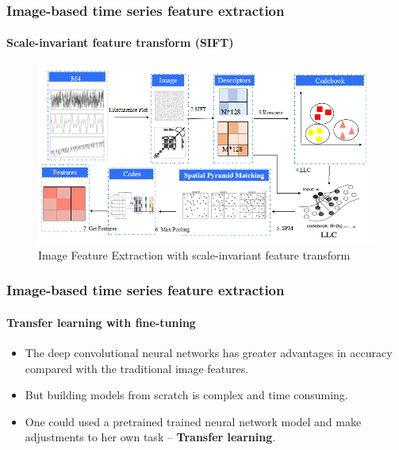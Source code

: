\documentclass[10pt,aspectratio=43]{beamer}
\begin{document}
\begin{frame}
  \frametitle{Image-based time series feature extraction}
  \framesubtitle{Scale-invariant feature transform (SIFT)}

\begin{figure}
  \centering \includegraphics[width=1\linewidth]{figures/feature_extraction_sift.png}
  \caption{Image Feature Extraction with scale-invariant feature transform}
  \label{fig:Feature extraction with traditional image processing method}
\end{figure}

\end{frame}

\begin{frame}
  \frametitle{Image-based time series feature extraction}
  \framesubtitle{Transfer learning with fine-tuning}

  \begin{itemize}
  \item The deep convolutional neural networks has greater advantages in accuracy compared
    with the traditional image features.

  \item But building models from scratch is complex and time consuming.


  \item One could used a pretrained trained neural network model and make adjustments to
    her own task -- \textbf{Transfer learning}.

  \end{itemize}
\end{frame}
\end{document}
